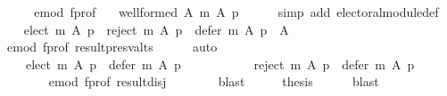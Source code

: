 \begin{isabellebody}
\ {\isacharminus}{\kern0pt}\isanewline
\ \ \isamarkupfalse%
\ e{\isacharunderscore}{\kern0pt}mod\ f{\isacharunderscore}{\kern0pt}prof\ \isamarkupfalse%
\ {}{\isacharcolon}{\kern0pt}\ {\isachardoublequoteopen}well{\isacharunderscore}{\kern0pt}formed\ A\ {\isacharparenleft}{\kern0pt}m\ A\ p{\isacharparenright}{\kern0pt}{\isachardoublequoteclose}\isanewline
\ \ \ \ \isamarkupfalse%
\ {\isacharparenleft}{\kern0pt}simp\ add{\isacharcolon}{\kern0pt}\ electoral{\isacharunderscore}{\kern0pt}module{\isacharunderscore}{\kern0pt}def{\isacharparenright}{\kern0pt}\isanewline
\ \ \isamarkupfalse%
\ {\isachardoublequoteopen}{\isacharparenleft}{\kern0pt}elect\ m\ A\ p{\isacharparenright}{\kern0pt}\ {\isasymunion}\ {\isacharparenleft}{\kern0pt}reject\ m\ A\ p{\isacharparenright}{\kern0pt}\ {\isasymunion}\ {\isacharparenleft}{\kern0pt}defer\ m\ A\ p{\isacharparenright}{\kern0pt}\ {\isacharequal}{\kern0pt}\ A{\isachardoublequoteclose}\isanewline
\ \ \ \ \isamarkupfalse%
\ e{\isacharunderscore}{\kern0pt}mod\ f{\isacharunderscore}{\kern0pt}prof\ result{\isacharunderscore}{\kern0pt}presv{\isacharunderscore}{\kern0pt}alts\isanewline
\ \ \ \ \isamarkupfalse%
\ auto\isanewline
\ \ \isamarkupfalse%
\ \isamarkupfalse%
\ {}\ \isamarkupfalse%
\isanewline
\ \ \ \ {\isachardoublequoteopen}{\isacharparenleft}{\kern0pt}elect\ m\ A\ p{\isacharparenright}{\kern0pt}\ {\isasyminter}\ {\isacharparenleft}{\kern0pt}defer\ m\ A\ p{\isacharparenright}{\kern0pt}\ {\isacharequal}{\kern0pt}\ {\isacharbraceleft}{\kern0pt}{\isacharbraceright}{\kern0pt}\ {\isasymand}\isanewline
\ \ \ \ \ \ \ \ {\isacharparenleft}{\kern0pt}reject\ m\ A\ p{\isacharparenright}{\kern0pt}\ {\isasyminter}\ {\isacharparenleft}{\kern0pt}defer\ m\ A\ p{\isacharparenright}{\kern0pt}\ {\isacharequal}{\kern0pt}\ {\isacharbraceleft}{\kern0pt}{\isacharbraceright}{\kern0pt}{\isachardoublequoteclose}\isanewline
\ \ \ \ \ \ \isamarkupfalse%
\ e{\isacharunderscore}{\kern0pt}mod\ f{\isacharunderscore}{\kern0pt}prof\ result{\isacharunderscore}{\kern0pt}disj\isanewline
\ \ \ \ \ \ \isamarkupfalse%
\ blast\isanewline
\ \ \isamarkupfalse%
\ \isamarkupfalse%
\ {\isacharquery}{\kern0pt}thesis\isanewline
\ \ \ \ \isamarkupfalse%
\ blast\isanewline
{}\isamarkupfalse%
%
\endisatagproof
{\isafoldproof}%
%
\isadelimproof
\isanewline
%
\endisadelimproof
\isanewline
{}\isamarkupfalse%

\end{isabellebody}
